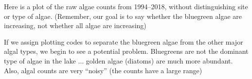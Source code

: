\documentclass[10pt]{beamer}
\begin{document}
\begin{frame}
\begin{center}
\end{center}

\vspace{-2ex}
{\scriptsize Here is a plot of the raw algae counts from 1994--2018,
  without distinguishing site or type of algae.  (Remember, our goal is to say
  whether the bluegreen algae are increasing, not whether all algae are increasing)\\}
\end{frame}


\begin{frame}
\begin{center}
\end{center}

\vspace{-2ex}
{\scriptsize If we assign plotting codes to separate the bluegreen
  algae from the other major algal types, we begin to see a potential
  problem.  Bluegreens are not the dominant type of algae in the lake $\ldots$
  golden algae (diatoms) are much more abundant.  Also, algal counts are very
  ``noisy'' (the counts have a large range)\\}
\end{frame}
\end{document}

